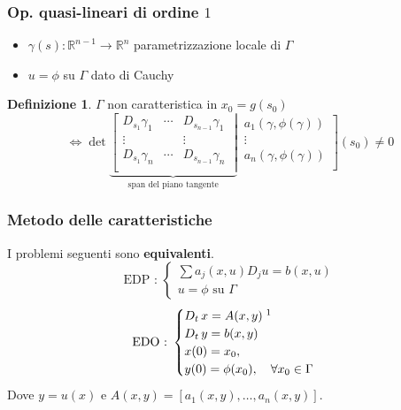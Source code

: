\documentclass[serif,notheorems]{beamer}
\theoremstyle{plain} %
\theoremstyle{definition} %
\newtheorem{definition}{Definizione}[section] %
\theoremstyle{remark}
\begin{document}
\begin{frame}
\frametitle{Op. quasi-lineari di ordine $1$}
\begin{itemize}
\item $\gamma (s): \mathbb{R}^{n-1}\rightarrow \mathbb{R}^n$ parametrizzazione locale di $\Gamma$
\item $u = \phi$ su $\Gamma$ dato di Cauchy
\end{itemize}
\begin{definition}
$\Gamma$ non caratteristica in $x_0=g(s_0)$\\
\begin{equation*}
\iff \det
\underbrace{
\left[
\begin{matrix}
D_{s_1}\gamma_1 & \cdots & D_{s_{n-1}}\gamma_1 \\
\vdots &  & \vdots \\
D_{s_1}\gamma_n & \cdots & D_{s_{n-1}}\gamma_n \\
\end{matrix}\;\right|}_{\text{span del piano tangente}} \,
\left.
\begin{matrix}
a_1(\gamma, \phi(\gamma))\\
\vdots\\
a_n(\gamma, \phi(\gamma))\\
\end{matrix}\right] (s_0) \neq 0
\end{equation*}
\end{definition}
\end{frame}

\begin{frame}
\frametitle{Metodo delle caratteristiche}
I problemi seguenti sono \textbf{equivalenti}.
\begin{equation*}
\text{EDP : }
\begin{cases}
\sum a_j(x,u)D_j u = b(x,u)\\
u = \phi \text{ su } \Gamma
\end{cases} 
\end{equation*}
\begin{equation*}
\text{EDO : }
\begin{cases}
D_t \, x = A(x,y) \; \footnotemark \\
D_t \, y = b(x,y)\\ 
x(0)=x_0,\\ 
y(0) = \phi (x_0), \quad \forall x_0 \in \Gamma
\end{cases} 
\end{equation*}
Dove $y = u(x)$ e $A(x,y)=[a_1(x,y),\ldots ,a_n(x,y)]$.
\end{frame}
\end{document}
